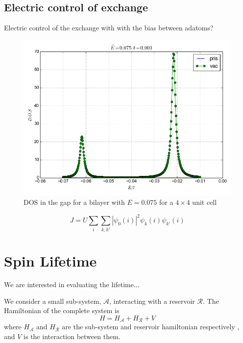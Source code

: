 \subsection{Electric control of exchange}
Electric control of the exchange with with the bias between adatoms?
\begin{figure}[h!]
\centering
\includegraphics{chapter06/figures/4x4_l0_075.png}
\vspace{-5pt}
\caption{DOS in the gap for a bilayer with $E=0.075$ for a $4\times4$ unit cell}
\end{figure}
\FloatBarrier
\begin{equation}
  J = U \sum_i\sum_{k,k'} |\psi_0(i)|^2\psi_k(i)\psi_{k'}(i)
\end{equation}



\section{Spin Lifetime}
We are interested in evaluating the lifetime...

We consider a small sub-system, $\mathcal{A}$, interacting with a reservoir $\mathcal{R}$. The Hamiltonian of the complete system is
\begin{equation}
  H = H_{\mathcal{A}} + H_{\mathcal{R}} + V
\end{equation}
where $H_{\mathcal{A}}$ and $H_{\mathcal{R}}$ are the sub-system and reservoir hamiltonian respectively , and $V$ is the interaction between them.

